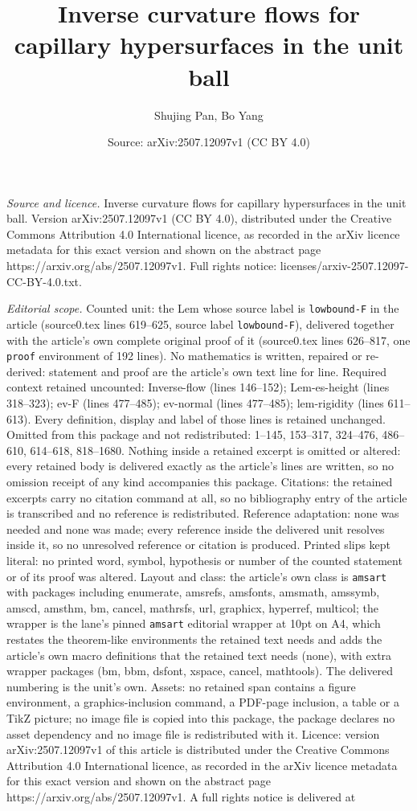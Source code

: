\documentclass[10pt,a4paper]{amsart}
\title[Inverse curvature flows for capillary hypersurfaces in the u]{Inverse curvature flows for capillary hypersurfaces in the unit ball}
\author{Shujing Pan, Bo Yang}
\date{Source: arXiv:2507.12097v1 (CC BY 4.0)}
\begin{document}
\maketitle

\noindent\emph{Source and licence.} Inverse curvature flows for capillary hypersurfaces in the unit ball. Version arXiv:2507.12097v1 (CC BY 4.0), distributed under the Creative Commons Attribution 4.0 International licence, as recorded in the arXiv licence metadata for this exact version and shown on the abstract page https://arxiv.org/abs/2507.12097v1. Full rights notice: licenses/arxiv-2507.12097-CC-BY-4.0.txt.\par\smallskip

\noindent\textit{Editorial scope.} Counted unit: the Lem whose source label is \texttt{lowbound-F} in the article (source0.tex lines 619--625, source label \texttt{lowbound-F}), delivered together with the article's own complete original proof of it (source0.tex lines 626--817, one \texttt{proof} environment of 192 lines). No mathematics is written, repaired or re-derived: statement and proof are the article's own text line for line. Required context retained uncounted: Inverse-flow (lines 146--152); Lem-es-height (lines 318--323); ev-F (lines 477--485); ev-normal (lines 477--485); lem-rigidity (lines 611--613). Every definition, display and label of those lines is retained unchanged. Omitted from this package and not redistributed: 1--145, 153--317, 324--476, 486--610, 614--618, 818--1680. Nothing inside a retained excerpt is omitted or altered: every retained body is delivered exactly as the article's lines are written, so no omission receipt of any kind accompanies this package. Citations: the retained excerpts carry no citation command at all, so no bibliography entry of the article is transcribed and no reference is redistributed. Reference adaptation: none was needed and none was made; every reference inside the delivered unit resolves inside it, so no unresolved reference or citation is produced. Printed slips kept literal: no printed word, symbol, hypothesis or number of the counted statement or of its proof was altered. Layout and class: the article's own class is \texttt{amsart} with packages including enumerate, amsrefs, amsfonts, amsmath, amssymb, amscd, amsthm, bm, cancel, mathrsfs, url, graphicx, hyperref, multicol; the wrapper is the lane's pinned \texttt{amsart} editorial wrapper at 10pt on A4, which restates the theorem-like environments the retained text needs and adds the article's own macro definitions that the retained text needs (none), with extra wrapper packages (bm, bbm, dsfont, xspace, cancel, mathtools). The delivered numbering is the unit's own. Assets: no retained span contains a figure environment, a graphics-inclusion command, a PDF-page inclusion, a table or a TikZ picture; no image file is copied into this package, the package declares no asset dependency and no image file is redistributed with it. Licence: version arXiv:2507.12097v1 of this article is distributed under the Creative Commons Attribution 4.0 International licence, as recorded in the arXiv licence metadata for this exact version and shown on the abstract page https://arxiv.org/abs/2507.12097v1. A full rights notice is delivered at 
\end{document}
